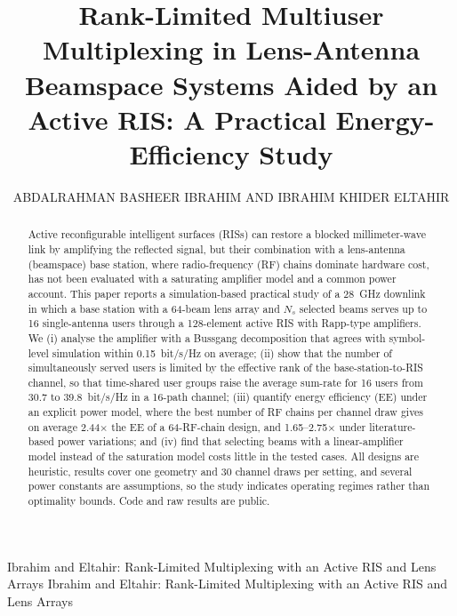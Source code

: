 \documentclass{ieeeaccess}
\begin{document}
\newlength{\xfigwd}\setlength{\xfigwd}{\columnwidth}

\title{Rank-Limited Multiuser Multiplexing in Lens-Antenna Beamspace Systems Aided by an Active RIS: A Practical Energy-Efficiency Study}
\author{\uppercase{Abdalrahman Basheer Ibrahim} AND \uppercase{Ibrahim Khider Eltahir}}
\address[1]{Department of Electronics Engineering, Faculty of Engineering, Sudan University of Science and Technology (SUST), Khartoum 00407, Sudan}
\address[2]{Department of Cybersecurity Technologies, Al-Esraa University, Baghdad, Iraq}

\markboth
{Ibrahim and Eltahir: Rank-Limited Multiplexing with an Active RIS and Lens Arrays}
{Ibrahim and Eltahir: Rank-Limited Multiplexing with an Active RIS and Lens Arrays}


\begin{abstract}
Active reconfigurable intelligent surfaces (RISs) can restore a blocked millimeter-wave link by amplifying the reflected signal, but their combination with a lens-antenna (beamspace) base station, where radio-frequency (RF) chains dominate hardware cost, has not been evaluated with a saturating amplifier model and a common power account. This paper reports a simulation-based practical study of a 28~GHz downlink in which a base station with a 64-beam lens array and $N_s$ selected beams serves up to 16 single-antenna users through a 128-element active RIS with Rapp-type amplifiers. We (i) analyse the amplifier with a Bussgang decomposition that agrees with symbol-level simulation within 0.15~bit/s/Hz on average; (ii) show that the number of simultaneously served users is limited by the effective rank of the base-station-to-RIS channel, so that time-shared user groups raise the average sum-rate for 16 users from 30.7 to 39.8~bit/s/Hz in a 16-path channel; (iii) quantify energy efficiency (EE) under an explicit power model, where the best number of RF chains per channel draw gives on average 2.44$\times$ the EE of a 64-RF-chain design, and 1.65--2.75$\times$ under literature-based power variations; and (iv) find that selecting beams with a linear-amplifier model instead of the saturation model costs little in the tested cases. All designs are heuristic, results cover one geometry and 30 channel draws per setting, and several power constants are assumptions, so the study indicates operating regimes rather than optimality bounds. Code and raw results are public.
\end{abstract}
\end{document}
